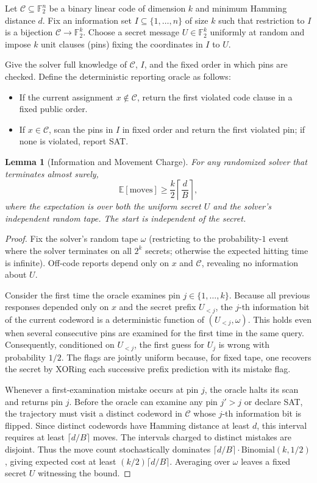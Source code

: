 \documentclass[11pt,a4paper]{article}
\newtheorem{lemma}[theorem]{Lemma}
\theoremstyle{definition}
\theoremstyle{remark}
\newcommand{\F}{\mathbb{F}}
\newcommand{\E}{\mathbb{E}}
\begin{document}
Let $\mathcal{C} \subseteq \F_2^n$ be a binary linear code of dimension $k$ and minimum Hamming distance $d$. Fix an information set $I \subseteq \{1,\dots,n\}$ of size $k$ such that restriction to $I$ is a bijection $\mathcal{C} \to \F_2^k$. Choose a secret message $U \in \F_2^k$ uniformly at random and impose $k$ unit clauses (pins) fixing the coordinates in $I$ to $U$.

Give the solver full knowledge of $\mathcal{C}$, $I$, and the fixed order in which pins are checked. Define the deterministic reporting oracle as follows:
\begin{itemize}
    \item If the current assignment $x \notin \mathcal{C}$, return the first violated code clause in a fixed public order.
    \item If $x \in \mathcal{C}$, scan the pins in $I$ in fixed order and return the first violated pin; if none is violated, report \textsc{SAT}.
\end{itemize}

\begin{lemma}[Information and Movement Charge]\label{lem:charge}
For any randomized solver that terminates almost surely,
\[
    \E[\text{moves}] \ge \frac{k}{2}\left\lceil \frac{d}{B} \right\rceil,
\]
where the expectation is over both the uniform secret $U$ and the solver's independent random tape. The start is independent of the secret.
\end{lemma}

\begin{proof}
Fix the solver's random tape $\omega$ (restricting to the probability-$1$ event where the solver terminates on all $2^k$ secrets; otherwise the expected hitting time is infinite). Off-code reports depend only on $x$ and $\mathcal{C}$, revealing no information about $U$.

Consider the first time the oracle examines pin $j \in \{1,\dots,k\}$. Because all previous responses depended only on $x$ and the secret prefix $U_{<j}$, the $j$-th information bit of the current codeword is a deterministic function of $(U_{<j}, \omega)$. This holds even when several consecutive pins are examined for the first time in the same query. Consequently, conditioned on $U_{<j}$, the first guess for $U_j$ is wrong with probability $1/2$. The flags are jointly uniform because, for fixed tape, one recovers the secret by XORing each successive prefix prediction with its mistake flag.

Whenever a first-examination mistake occurs at pin $j$, the oracle halts its scan and returns pin $j$. Before the oracle can examine any pin $j' > j$ or declare \textsc{SAT}, the trajectory must visit a distinct codeword in $\mathcal{C}$ whose $j$-th information bit is flipped. Since distinct codewords have Hamming distance at least $d$, this interval requires at least $\lceil d/B \rceil$ moves. The intervals charged to distinct mistakes are disjoint. Thus the move count stochastically dominates $\lceil d/B \rceil \cdot \mathrm{Binomial}(k, 1/2)$, giving expected cost at least $(k/2)\lceil d/B \rceil$. Averaging over $\omega$ leaves a fixed secret $U$ witnessing the bound.
\end{proof}
\end{document}
